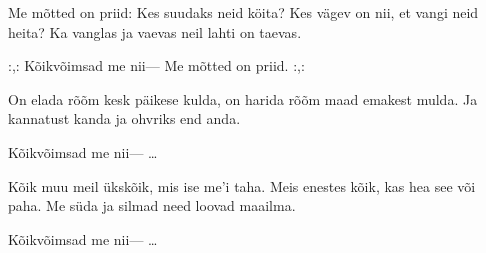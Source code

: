 Me m\~otted on priid:
Kes suudaks neid k\"oita?
Kes v\"agev on nii,
et vangi neid heita?
Ka vanglas ja vaevas
neil lahti on taevas.

:,: K\~oikv\~oimsad me nii---
Me m\~otted on priid. :,:

On elada r\~o\~om
kesk p\"aikese kulda,
on harida r\~o\~om
maad emakest mulda.
Ja kannatust kanda
ja ohvriks end anda.

K\~oikv\~oimsad me nii--- \ldots

K\~oik muu meil \"uksk\~oik,
mis ise me'i taha.
Meis enestes k\~oik,
kas hea see v\~oi paha.
Me s\"uda ja silmad
need loovad maailma.

K\~oikv\~oimsad me nii--- \ldots